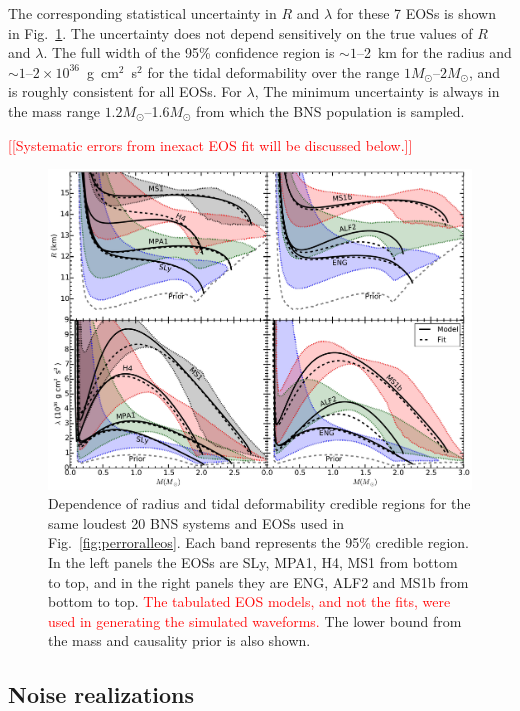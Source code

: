 \documentclass[twocolumn,prd,amssymb,aps,nofootinbib,showpacs,epsf]{revtex4}
\newcommand{\red}{\textcolor{red}}
\newcommand\ben[2]{\textcolor{red}{{#1}\sout{#2}}}
\begin{document}
The corresponding statistical uncertainty in $R$ and $\lambda$ for these 7 EOSs is shown in Fig.~\ref{fig:structurealleos}. The uncertainty does not depend sensitively on the true values of $R$ and $\lambda$. The full width of the 95\% confidence region is $\sim 1$--2~km for the radius and $\sim 1$--$2\times 10^{36}$~g~cm$^2$~s$^2$ for the tidal deformability over the range $1M_\odot$--$2M_\odot$, and is roughly consistent for all EOSs. For $\lambda$, The minimum uncertainty is always in the mass range $1.2M_\odot$--1.6$M_\odot$ from which the BNS population is sampled.

\red{[[Systematic errors from inexact EOS fit will be discussed below.]]}

\begin{figure}[!htb]
\begin{center}
\includegraphics[width=6.4in]{constraintsalleos.pdf}
\caption{Dependence of radius and tidal deformability credible regions for the same loudest 20 BNS systems and EOSs used in Fig.~\ref{fig:perroralleos}. Each band represents the 95\% credible region. In the left panels the EOSs are SLy, MPA1, H4, MS1 from bottom to top, and in the right panels they are ENG, ALF2 and MS1b from bottom to top. \ben{The tabulated EOS models, and not the fits, were used in generating the simulated waveforms.}{} The lower bound from the mass and causality prior is also shown.}
\label{fig:structurealleos}
\end{center}
\end{figure}


\subsection{Noise realizations}
\end{document}
